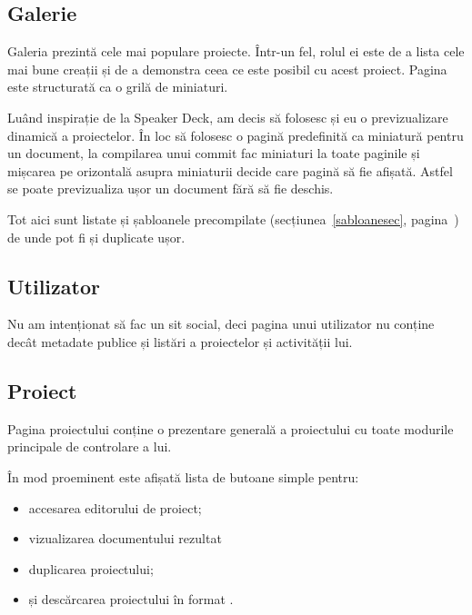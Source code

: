 \documentclass[a4wide,12pt]{report}
\newcommand{\eng}[1]{{#1}} %
\newcommand{\acr}[1]{{\textsmaller[1]{\textsc{#1}}}} %
\begin{document}
\subsection{Galerie}
\label{galeriesub}

Galeria prezintă cele mai populare proiecte. Într-un fel, rolul ei este de a
lista cele mai bune creații și de a demonstra ceea ce este posibil cu acest
proiect. Pagina este structurată ca o grilă de miniaturi.

Luând inspirație de la Speaker Deck, am decis să folosesc și eu o
previzualizare dinamică a proiectelor. În loc să folosesc o pagină predefinită
ca miniatură pentru un document, la compilarea unui \eng{commit} fac miniaturi
la toate paginile și mișcarea pe orizontală asupra miniaturii decide care pagină
să fie afișată. Astfel se poate previzualiza ușor un document fără să fie
deschis.

Tot aici sunt listate și șabloanele precompilate (secțiunea~\ref{sabloanesec},
pagina~\pageref{sabloanesec}) de unde pot fi și duplicate ușor.

\subsection{Utilizator}

Nu am intenționat să fac un sit social, deci pagina unui utilizator nu conține
decât metadate publice și listări a proiectelor și activității lui.

\subsection{Proiect}

Pagina proiectului conține o prezentare generală a proiectului cu toate modurile
principale de controlare a lui.

În mod proeminent este afișată lista de butoane simple pentru:

\begin{itemize}

\item accesarea editorului de proiect;

\item vizualizarea documentului \acr{PDF} rezultat

\item duplicarea proiectului;

\item și descărcarea proiectului în format \acr{ZIP}.

\end{itemize}
\end{document}
